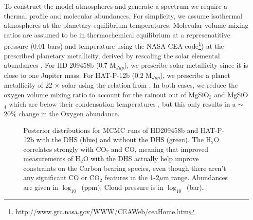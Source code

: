 \documentclass[iop]{emulateapj}
\begin{document}
To construct the model atmospheres and generate a spectrum we require a thermal profile and molecular abundances. For simplicity, we assume isothermal atmospheres at the planetary equilibrium temperatures. Molecular volume mixing ratios are assumed to be in thermochemical equilibrium at a represenatitive pressure (0.01 bars) and temperature using the NASA CEA code\footnote{http://www.grc.nasa.gov/WWW/CEAWeb/ceaHome.htm}\citep{gordon1996cea}) at the prescribed planetary metallicity, derived by rescaling the solar elemental abundances \citep{asplund}.
For HD 209458b (0.7 M$_{Jup}$), we prescribe solar metallicity since it is close to one Jupiter mass.
For HAT-P-12b (0.2 M$_{Jup}$), we prescribe a planet metallicity of 22 $\times$ solar using the relation from \citet{kreidberg2014wasp43}.
In both cases, we reduce the oxygen volume mixing ratio to account for the rainout out of MgSiO$_3$ and MgSiO$_4$ which are below their condensation temperatures \citep{sing2016continuum}, but this only results in a $\sim$ 20\% change in the Oxygen abundance.


\begin{figure}[!t]
\centering
{}
	\caption{Posterior distributions for MCMC runs of HD209458b and HAT-P-12b with the DHS (blue) and without the DHS (green). The H$_2$O correlates strongly with CO$_2$ and CO, meaning that improved measurements of H$_2$O with the DHS actually help improve constraints on the Carbon bearing species, even though there aren't any significant CO or CO$_2$ features in the 1-2$\mu$m range. Abundances are given in $\log_{10}$~(ppm). Cloud pressure is in $\log_{10}$~(bar).}
	\label{fig:corner}
\end{figure} 
\end{document}
